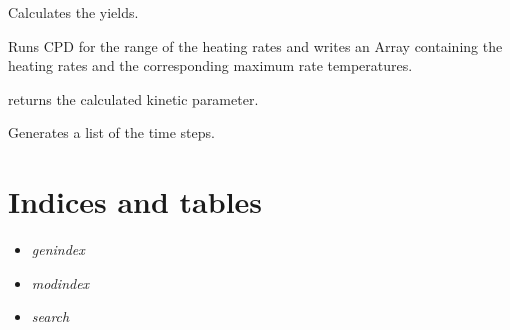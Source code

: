 \documentclass[letterpaper,10pt,english]{sphinxmanual}
\begin{document}
\begin{fulllineitems}
\begin{fulllineitems}
\label{Appendix:CPD_Fit_lin_regr.ProcessCPD.calcYield}
Calculates the yields.

\end{fulllineitems}


\begin{fulllineitems}
\label{Appendix:CPD_Fit_lin_regr.ProcessCPD.generateRuns}
Runs CPD for the range of the heating rates and writes an Array containing the heating rates and the corresponding maximum rate temperatures.

\end{fulllineitems}


\begin{fulllineitems}
\label{Appendix:CPD_Fit_lin_regr.ProcessCPD.getAE}
returns the calculated kinetic parameter.

\end{fulllineitems}


\begin{fulllineitems}
\label{Appendix:CPD_Fit_lin_regr.ProcessCPD.makeDt}
Generates a list of the time steps.

\end{fulllineitems}


\end{fulllineitems}



\chapter{Indices and tables}
\label{index:indices-and-tables}\begin{itemize}
\item {} 
\emph{genindex}

\item {} 
\emph{modindex}

\item {} 
\emph{search}

\end{itemize}



\renewcommand{\indexname}{Index}
\printindex
\end{document}
